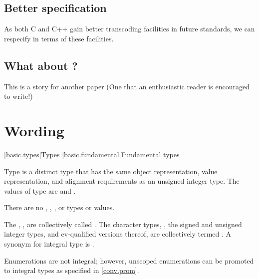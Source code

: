 \documentclass{wg21}
\begin{document}
\subsection{Better specification}

As both C and C++ gain better transcoding facilities in future standards, we can respecify in terms of these facilities.

\subsection{What about ?}

This is a story for another paper (One that an enthusiastic reader is encouraged to write!)

\section{Wording}

[basic.types]{Types}%
[basic.fundamental]{Fundamental types}


\pnum
{}%
%
Type  is a distinct type that has
the same object representation,
value representation, and
alignment requirements as
an  unsigned integer type.
The values of type  are
 and .
\begin{note}
    There are no , ,
    , or  types or values.
\end{note}

\pnum
{}%
The , ,   
are collectively called .
The character types, ,
the signed and unsigned integer types,
and cv-qualified versions thereof,
are collectively termed
.
A synonym for integral type is .
\begin{note}
    Enumerations are not integral;
    however, unscoped enumerations can be promoted to integral types
    as specified in \ref{conv.prom}.
\end{note}
\end{document}
